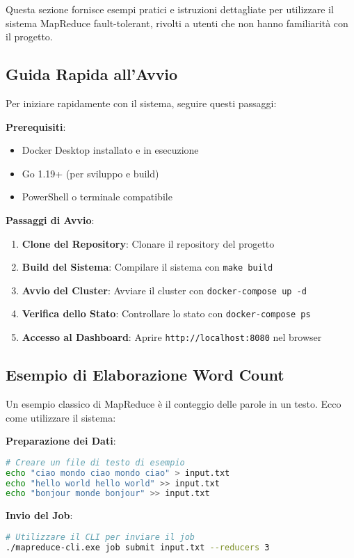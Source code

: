 \documentclass[12pt,a4paper]{article}
\begin{document}
Questa sezione fornisce esempi pratici e istruzioni dettagliate per utilizzare il sistema MapReduce fault-tolerant, rivolti a utenti che non hanno familiarità con il progetto.

\subsection{Guida Rapida all'Avvio}

Per iniziare rapidamente con il sistema, seguire questi passaggi:

\textbf{Prerequisiti}:
\begin{itemize}
\item Docker Desktop installato e in esecuzione
\item Go 1.19+ (per sviluppo e build)
\item PowerShell o terminale compatibile
\end{itemize}

\textbf{Passaggi di Avvio}:
\begin{enumerate}
\item \textbf{Clone del Repository}: Clonare il repository del progetto
\item \textbf{Build del Sistema}: Compilare il sistema con \texttt{make build}
\item \textbf{Avvio del Cluster}: Avviare il cluster con \texttt{docker-compose up -d}
\item \textbf{Verifica dello Stato}: Controllare lo stato con \texttt{docker-compose ps}
\item \textbf{Accesso al Dashboard}: Aprire \texttt{http://localhost:8080} nel browser
\end{enumerate}

\subsection{Esempio di Elaborazione Word Count}

Un esempio classico di MapReduce è il conteggio delle parole in un testo. Ecco come utilizzare il sistema:

\textbf{Preparazione dei Dati}:
\begin{lstlisting}[language=bash, caption=Preparazione file di input]
# Creare un file di testo di esempio
echo "ciao mondo ciao mondo ciao" > input.txt
echo "hello world hello world" >> input.txt
echo "bonjour monde bonjour" >> input.txt
\end{lstlisting}

\textbf{Invio del Job}:
\begin{lstlisting}[language=bash, caption=Invio job tramite CLI]
# Utilizzare il CLI per inviare il job
./mapreduce-cli.exe job submit input.txt --reducers 3
\end{lstlisting}
\end{document}
